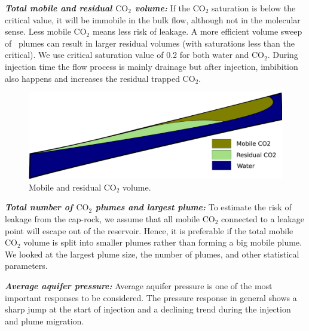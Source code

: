 
\textbf{\textit{Total mobile and residual $\mbox{CO}_2$ volume:}}
If the CO$_2$ saturation is below the critical value, it will be immobile in the
bulk flow, although not in the molecular sense. Less mobile CO$_2$ means less
risk of leakage. A more efficient volume sweep  of \coo\ plumes can result in larger residual volumes (with saturations less than the
critical). We use
critical saturation value of 0.2 for both water and CO$_2$. During injection time the
flow process is mainly drainage but after injection, imbibition also happens and
increases the residual trapped CO$_2$. 

\begin{figure}[thb]
  \centering
  \includegraphics[width=0.65 \linewidth]{./figurer/MobRes} 
  \caption{Mobile and residual CO$_2$ volume.}
  \label{fig:MobRes}
%
\end{figure}

\textbf{\textit{Total number of $\mbox{CO}_2$ plumes and largest plume:}} To
estimate the risk of leakage from the cap-rock, we assume that all mobile
CO$_2$ connected to a leakage point will escape out of the reservoir. Hence, it
is preferable if the total mobile CO$_2$ volume is split into smaller plumes
rather than forming a big mobile plume. We looked at the largest plume size, the number of
plumes, and other statistical parameters. 

% 

\textbf{\textit{Average aquifer pressure:}} Average aquifer pressure is one of
the most important responses to be
considered. The pressure response in general shows a sharp jump at the start of
injection and a declining trend during the injection and plume migration.  

